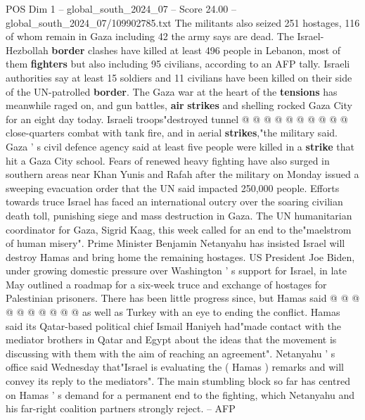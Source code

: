 \begin{textsample}{POS Dim 1 – global\_south\_2024\_07 – Score 24.00 – global\_south\_2024\_07/109902785.txt}
The militants also seized 251 hostages, 116 of whom remain in Gaza including 42 the army says are dead.
The Israel-Hezbollah \textbf{border} clashes have killed at least 496 people in Lebanon, most of them \textbf{fighters} but also including 95 civilians, according to an AFP tally.
Israeli authorities say at least 15 soldiers and 11 civilians have been killed on their side of the UN-patrolled \textbf{border}.
The Gaza war at the heart of the \textbf{tensions} has meanwhile raged on, and gun battles, \textbf{air} \textbf{strikes} and shelling rocked Gaza City for an eight day today.
Israeli troops"destroyed tunnel @ @ @ @ @ @ @ @ @ @ close-quarters combat with tank fire, and in aerial \textbf{strikes},"the military said.
Gaza ' s civil defence agency said at least five people were killed in a \textbf{strike} that hit a Gaza City school.
Fears of renewed heavy fighting have also surged in southern areas near Khan Yunis and Rafah after the military on Monday issued a sweeping evacuation order that the UN said impacted 250,000 people.
Efforts towards truce Israel has faced an international outcry over the soaring civilian death toll, punishing siege and mass destruction in Gaza.
The UN humanitarian coordinator for Gaza, Sigrid Kaag, this week called for an end to the"maelstrom of human misery".
Prime Minister Benjamin Netanyahu has insisted Israel will destroy Hamas and bring home the remaining hostages.
US President Joe Biden, under growing domestic pressure over Washington ' s support for Israel, in late May outlined a roadmap for a six-week truce and exchange of hostages for Palestinian prisoners.
There has been little progress since, but Hamas said @ @ @ @ @ @ @ @ @ @ as well as Turkey with an eye to ending the conflict.
Hamas said its Qatar-based political chief Ismail Haniyeh had"made contact with the mediator brothers in Qatar and Egypt about the ideas that the movement is discussing with them with the aim of reaching an agreement".
Netanyahu ' s office said Wednesday that"Israel is evaluating the ( Hamas ) remarks and will convey its reply to the mediators".
The main stumbling block so far has centred on Hamas ' s demand for a permanent end to the fighting, which Netanyahu and his far-right coalition partners strongly reject. -- AFP

\end{textsample}
